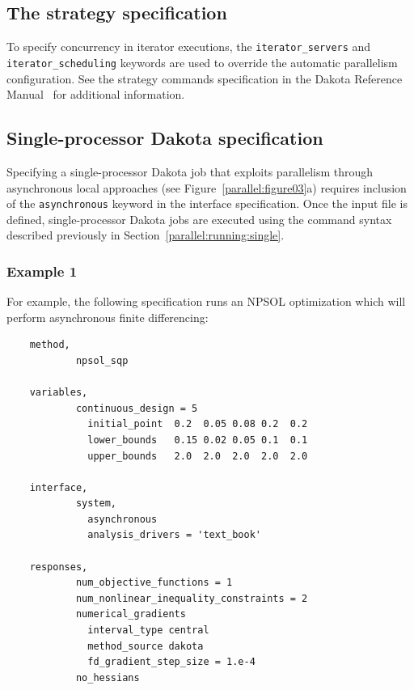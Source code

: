 \subsection{The strategy specification}\label{parallel:spec:strategy}

To specify concurrency in iterator executions, the
\texttt{iterator\_servers} and \texttt{iterator\_scheduling} keywords
are used to override the automatic parallelism configuration. See the
strategy commands specification in the Dakota Reference
Manual~\cite{RefMan} for additional information.

\subsection{Single-processor Dakota specification}\label{parallel:spec:single}

Specifying a single-processor Dakota job that exploits parallelism
through asynchronous local approaches (see
Figure~\ref{parallel:figure03}a) requires inclusion of the
\texttt{asynchronous} keyword in the interface specification. Once the
input file is defined, single-processor Dakota jobs are executed using
the command syntax described previously in
Section~\ref{parallel:running:single}.

\subsubsection{Example 1}\label{parallel:spec:single:example1}

For example, the following specification runs an NPSOL optimization
which will perform asynchronous finite differencing:
\begin{small}
\begin{verbatim}
    method,
            npsol_sqp

    variables,
            continuous_design = 5
              initial_point  0.2  0.05 0.08 0.2  0.2
              lower_bounds   0.15 0.02 0.05 0.1  0.1
              upper_bounds   2.0  2.0  2.0  2.0  2.0

    interface,
            system,
              asynchronous
              analysis_drivers = 'text_book'

    responses,
            num_objective_functions = 1
            num_nonlinear_inequality_constraints = 2
            numerical_gradients
              interval_type central
              method_source dakota
              fd_gradient_step_size = 1.e-4
            no_hessians
\end{verbatim}
\end{small}

